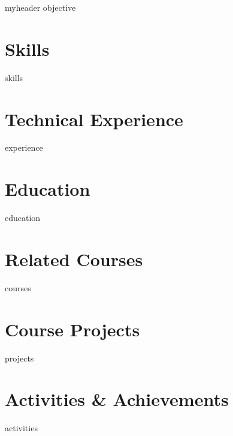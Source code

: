 \documentclass[letter,11pt]{article}
\author{Hadi Rohani} %
\begin{document}
{myheader}
{objective}

\section{Skills}
{skills}

\section{Technical Experience}
{experience}

\section{Education}
{education}




\section{Related Courses}
{courses}


\section{Course Projects}
{projects}


\section{Activities \& Achievements}
{activities}
\end{document}
